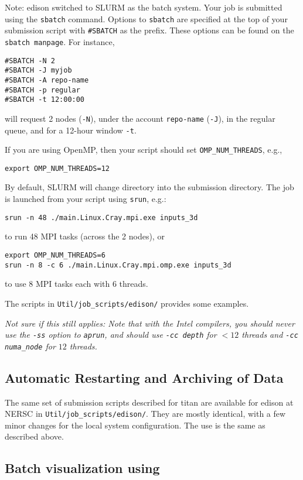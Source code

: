 Note: edison switched to SLURM as the batch system.  Your job is submitted
using the {\tt sbatch} command.  Options to {\tt sbatch} are specified at the
top of your submission script with {\tt \#SBATCH} as the prefix.  These options
can be found on the {\tt sbatch manpage}.  For instance, 
\begin{verbatim}
#SBATCH -N 2
#SBATCH -J myjob
#SBATCH -A repo-name
#SBATCH -p regular
#SBATCH -t 12:00:00
\end{verbatim}
will request 2 nodes ({\tt -N}), under the account {\tt repo-name} ({\tt -J}),
in the regular queue, and for a 12-hour window {\tt -t}.

If you are using OpenMP, then your script should set {\tt OMP\_NUM\_THREADS}, e.g.,
\begin{verbatim}
export OMP_NUM_THREADS=12
\end{verbatim}

By default, SLURM will change directory into the submission directory.  The 
job is launched from your script using {\tt srun}, e.g.:
\begin{verbatim}
srun -n 48 ./main.Linux.Cray.mpi.exe inputs_3d
\end{verbatim}
to run 48 MPI tasks (across the 2 nodes), or 
\begin{verbatim}
export OMP_NUM_THREADS=6
srun -n 8 -c 6 ./main.Linux.Cray.mpi.omp.exe inputs_3d
\end{verbatim}
to use 8 MPI tasks each with 6 threads.

The scripts in {\tt Util/job\_scripts/edison/} provides some examples.

{\em Not sure if this still applies: Note that with the Intel compilers, you should never use the {\tt -ss}
option to {\tt aprun}, and should use {\tt -cc depth} for $< 12$
threads and {\tt -cc numa\_node} for $12$ threads.}



\subsection{Automatic Restarting and Archiving of Data}

The same set of submission scripts described for titan are available
for edison at NERSC in {\tt Util/job\_scripts/edison/}.  They are
mostly identical, with a few minor changes for the local system
configuration.  The use is the same as described above.

\subsection{Batch visualization using \yt}

